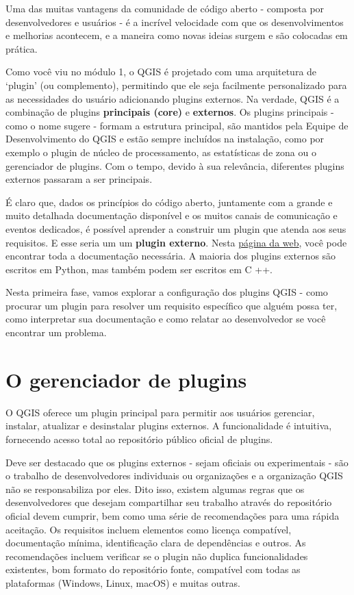 \documentclass[
]{krantz}
\begin{document}
Uma das muitas vantagens da comunidade de código aberto - composta por desenvolvedores e usuários - é a incrível velocidade com que os desenvolvimentos e melhorias acontecem, e a maneira como novas ideias surgem e são colocadas em prática.

Como você viu no módulo 1, o QGIS é projetado com uma arquitetura de `plugin' (ou complemento), permitindo que ele seja facilmente personalizado para as necessidades do usuário adicionando plugins externos. Na verdade, QGIS é a combinação de plugins \textbf{principais (core)} e \textbf{externos}. Os plugins principais - como o nome sugere - formam a estrutura principal, são mantidos pela Equipe de Desenvolvimento do QGIS e estão sempre incluídos na instalação, como por exemplo o plugin de núcleo de processamento, as estatísticas de zona ou o gerenciador de plugins. Com o tempo, devido à sua relevância, diferentes plugins externos passaram a ser principais.

É claro que, dados os princípios do código aberto, juntamente com a grande e muito detalhada documentação disponível e os muitos canais de comunicação e eventos dedicados, é possível aprender a construir um plugin que atenda aos seus requisitos. E esse seria um um \textbf{plugin externo}. Nesta \href{https://plugins.qgis.org/}{página da web}, você pode encontrar toda a documentação necessária. A maioria dos plugins externos são escritos em Python, mas também podem ser escritos em C ++.

Nesta primeira fase, vamos explorar a configuração dos plugins QGIS - como procurar um plugin para resolver um requisito específico que alguém possa ter, como interpretar sua documentação e como relatar ao desenvolvedor se você encontrar um problema.

\hypertarget{o-gerenciador-de-plugins}{%
\section{O gerenciador de plugins}\label{o-gerenciador-de-plugins}}

O QGIS oferece um plugin principal para permitir aos usuários gerenciar, instalar, atualizar e desinstalar plugins externos. A funcionalidade é intuitiva, fornecendo acesso total ao repositório público oficial de plugins.

Deve ser destacado que os plugins externos - sejam oficiais ou experimentais - são o trabalho de desenvolvedores individuais ou organizações e a organização QGIS não se responsabiliza por eles. Dito isso, existem algumas regras que os desenvolvedores que desejam compartilhar seu trabalho através do repositório oficial devem cumprir, bem como uma série de recomendações para uma rápida aceitação. Os requisitos incluem elementos como licença compatível, documentação mínima, identificação clara de dependências e outros. As recomendações incluem verificar se o plugin não duplica funcionalidades existentes, bom formato do repositório fonte, compatível com todas as plataformas (Windows, Linux, macOS) e muitas outras.
\end{document}
